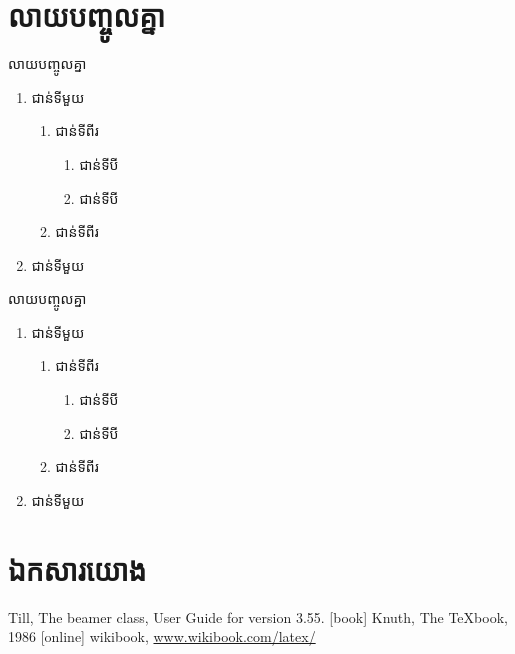 \documentclass[serif]{beamer}
\begin{document}
    \section{លាយបញ្ចូលគ្នា}
    \begin{frame}{លាយបញ្ចូលគ្នា}
        \begin{theorem}
            \begin{enumerate}[A]
            \item ជាន់ទីមួយ
            \begin{enumerate}[1]
                \item ជាន់ទីពីរ
                \begin{enumerate}[i]
                    \item ជាន់ទីបី
                    \item ជាន់ទីបី
                \end{enumerate}
                \item ជាន់ទីពីរ
            \end{enumerate}
            \item ជាន់ទីមួយ
        \end{enumerate}
        \end{theorem}
    \end{frame}
    \begin{frame}{លាយបញ្ចូលគ្នា}
        \begin{example}
            \begin{enumerate}[<+-|alert@+>][I]
                \item ជាន់ទីមួយ
                \begin{enumerate}[1]
                    \item ជាន់ទីពីរ
                    \begin{enumerate}[a]
                        \item ជាន់ទីបី
                        \item ជាន់ទីបី
                    \end{enumerate}
                    \item ជាន់ទីពីរ
                \end{enumerate}
                \item ជាន់ទីមួយ
            \end{enumerate}
        \end{example}
    \end{frame}
\section{ឯកសារយោង}
\begin{frame}
    \begin{thebibliography}{4}
         Till, The beamer class,
        \newblock User Guide for version 3.55.
        [book]
         Knuth, The TeXbook, 1986
        [online]
         wikibook, \url{www.wikibook.com/latex/}
    \end{thebibliography}
\end{frame}
\end{document}
